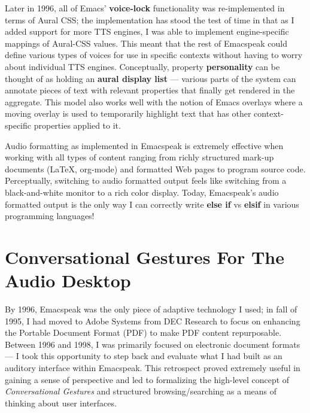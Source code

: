 \documentclass[11pt]{article}
\begin{document}
Later in 1996, all of Emacs' \textbf{voice-lock} functionality was
re-implemented in terms of Aural CSS; the implementation has
stood the test of time in that as I added support for more TTS
engines, I was able to implement engine-specific mappings of
Aural-CSS values. This meant that the rest of Emacspeak could
define various types of voices for use in specific contexts
without having to worry about individual TTS
engines. Conceptually, property \textbf{personality} can be thought of
as holding an \textbf{aural display list} — various parts of the system
can annotate pieces of text with relevant properties that finally
get rendered in the aggregate. This model also works well with
the notion of Emacs overlays where a moving overlay is used to
temporarily highlight text that has other context-specific
properties applied to it.


Audio formatting as implemented in Emacspeak is extremely
effective when working with all types of content ranging from
richly structured mark-up documents (\LaTeX{}, org-mode) and
formatted Web pages to program source code. Perceptually,
switching to audio formatted output feels like switching from a
black-and-white monitor to a rich color display. Today,
Emacspeak's audio formatted output is the only way I can
correctly write \textbf{else if} vs \textbf{elsif} in various programming
languages!

\section{Conversational Gestures For The Audio Desktop}
\label{sec:org2143cd0}

By 1996, Emacspeak was the only piece of adaptive technology I
used; in fall of 1995, I had moved to Adobe Systems from DEC
Research to focus on enhancing the Portable Document Format (PDF)
to make PDF content repurposable. Between 1996 and 1998, I was
primarily focused on electronic document formats — I took this
opportunity to step back and evaluate what I had built as an
auditory interface within Emacspeak. This retrospect proved
extremely useful in gaining a sense of perspective and led to
formalizing the high-level concept of \emph{Conversational Gestures}
and structured browsing/searching as a means of thinking about
user interfaces.
\end{document}
